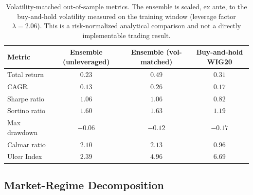 \documentclass{ieeeaccess}
\newcommand{\TRtest}{\ensuremath{0.23}}
\newcommand{\Shtest}{\ensuremath{1.06}}
\newcommand{\MDDtest}{\ensuremath{-0.06}}
\newcommand{\Calmtest}{\ensuremath{2.10}}
\newcommand{\CAGRtest}{\ensuremath{0.13}}
\newcommand{\BHtest}{\ensuremath{0.31}}
\newcommand{\BHsharpe}{\ensuremath{0.82}}
\newcommand{\MDDbh}{\ensuremath{-0.17}}
\newcommand{\CAGRbh}{\ensuremath{0.17}}
\newcommand{\Calmbh}{\ensuremath{0.96}}
\newcommand{\EnsSortino}{\ensuremath{1.60}}
\newcommand{\BHSortino}{\ensuremath{1.19}}
\newcommand{\EnsUlcer}{\ensuremath{2.39}}
\newcommand{\BHUlcer}{\ensuremath{6.69}}
\newcommand{\VolScaledTR}{\ensuremath{0.49}}
\newcommand{\VolScaledCAGR}{\ensuremath{0.26}}
\newcommand{\VolScaledSharpe}{\ensuremath{1.06}}
\newcommand{\VolScaledMDD}{\ensuremath{-0.12}}
\newcommand{\VolScaledCalmar}{\ensuremath{2.13}}
\newcommand{\VolScaledSortino}{\ensuremath{1.63}}
\newcommand{\VolScaledUlcer}{\ensuremath{4.96}}
\newcommand{\Leverage}{\ensuremath{2.06}}
\begin{document}
\begin{table}[t]
\centering
\caption{Volatility-matched out-of-sample metrics. The ensemble is scaled, ex ante, to the buy-and-hold volatility measured on the training window (leverage factor $\lambda = \Leverage{}$). This is a risk-normalized analytical comparison and not a directly implementable trading result.}
\label{tab:volmatched}
\begin{tabular}{lccc}
\toprule
Metric & Ensemble (unleveraged) & Ensemble (vol-matched) & Buy-and-hold WIG20 \\
\midrule
Total return     & $\TRtest$     & $\VolScaledTR$      & $\BHtest$ \\
CAGR             & $\CAGRtest$   & $\VolScaledCAGR$    & $\CAGRbh$ \\
Sharpe ratio     & $\Shtest$     & $\VolScaledSharpe$  & $\BHsharpe$ \\
Sortino ratio    & $\EnsSortino$ & $\VolScaledSortino$ & $\BHSortino$ \\
Max drawdown     & $\MDDtest$    & $\VolScaledMDD$     & $\MDDbh$ \\
Calmar ratio     & $\Calmtest$   & $\VolScaledCalmar$  & $\Calmbh$ \\
Ulcer Index      & $\EnsUlcer$   & $\VolScaledUlcer$   & $\BHUlcer$ \\
\bottomrule
\end{tabular}
\end{table}

\subsection{Market-Regime Decomposition}
\label{subsec:regime}
\end{document}
